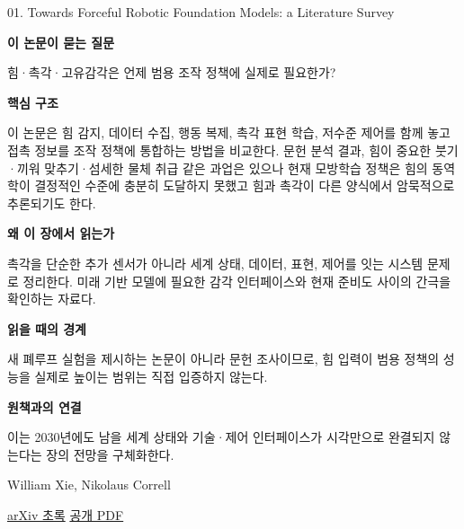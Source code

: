 \documentclass[11pt,openany]{book}
\begin{document}
\begin{termcard}{01. Towards Forceful Robotic Foundation Models: a Literature Survey}

\par

\medskip

{\sffamily\bfseries\color{deepblue} 이 논문이 묻는 질문}\par

힘·촉각·고유감각은 언제 범용 조작 정책에 실제로 필요한가?

\smallskip

{\sffamily\bfseries\color{deepblue} 핵심 구조}\par

이 논문은 힘 감지, 데이터 수집, 행동 복제, 촉각 표현 학습, 저수준 제어를 함께 놓고 접촉 정보를 조작 정책에 통합하는 방법을 비교한다. 문헌 분석 결과, 힘이 중요한 붓기·끼워 맞추기·섬세한 물체 취급 같은 과업은 있으나 현재 모방학습 정책은 힘의 동역학이 결정적인 수준에 충분히 도달하지 못했고 힘과 촉각이 다른 양식에서 암묵적으로 추론되기도 한다.

\smallskip

{\sffamily\bfseries\color{deepblue} 왜 이 장에서 읽는가}\par

촉각을 단순한 추가 센서가 아니라 세계 상태, 데이터, 표현, 제어를 잇는 시스템 문제로 정리한다. 미래 기반 모델에 필요한 감각 인터페이스와 현재 준비도 사이의 간극을 확인하는 자료다.

\smallskip

{\sffamily\bfseries\color{coral} 읽을 때의 경계}\par

새 폐루프 실험을 제시하는 논문이 아니라 문헌 조사이므로, 힘 입력이 범용 정책의 성능을 실제로 높이는 범위는 직접 입증하지 않는다.

\smallskip

{\sffamily\bfseries\color{teal} 원책과의 연결}\par

이는 2030년에도 남을 세계 상태와 기술·제어 인터페이스가 시각만으로 완결되지 않는다는 장의 전망을 구체화한다.

\medskip

{\footnotesize\color{muted} William Xie, Nikolaus Correll\par

\href{https://arxiv.org/abs/2504.11827}{arXiv 초록} \quad \href{https://arxiv.org/pdf/2504.11827}{공개 PDF}\par}

\end{termcard}
\end{document}
